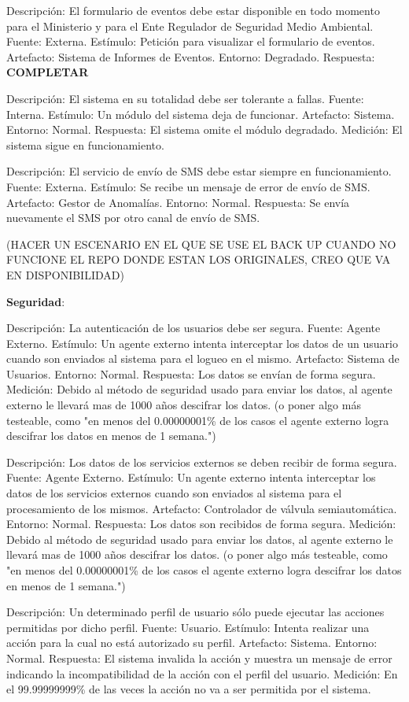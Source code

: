 \documentclass{article}
\theoremstyle{definition}
\theoremstyle{remark}
\begin{document}
Descripción: El formulario de eventos debe estar disponible en todo momento para el Ministerio y para el Ente Regulador de Seguridad Medio Ambiental.
Fuente: Externa.
Estímulo: Petición para visualizar el formulario de eventos.
Artefacto: Sistema de Informes de Eventos.
Entorno: Degradado.
Respuesta: \textbf{COMPLETAR}

Descripción: El sistema en su totalidad debe ser tolerante a fallas.
Fuente: Interna.
Estímulo: Un módulo del sistema deja de funcionar.
Artefacto: Sistema.
Entorno: Normal.
Respuesta: El sistema omite el módulo degradado.
Medición: El sistema sigue en funcionamiento.

Descripción: El servicio de envío de SMS debe estar siempre en funcionamiento.
Fuente: Externa.
Estímulo: Se recibe un mensaje de error de envío de SMS.
Artefacto: Gestor de Anomalías.
Entorno: Normal.
Respuesta: Se envía nuevamente el SMS por otro canal de envío de SMS.

(HACER UN ESCENARIO EN EL QUE SE USE EL BACK UP CUANDO NO FUNCIONE EL REPO DONDE ESTAN LOS ORIGINALES, CREO QUE VA EN DISPONIBILIDAD)

\textbf{Seguridad}:

Descripción: La autenticación de los usuarios debe ser segura.
Fuente: Agente Externo.
Estímulo: Un agente externo intenta interceptar los datos de un usuario cuando son enviados al sistema para el logueo en el mismo.
Artefacto: Sistema de Usuarios.
Entorno: Normal.
Respuesta: Los datos se envían de forma segura.
Medición: Debido al método de seguridad usado para enviar los datos, al agente externo le llevará mas de 1000 años descifrar los datos. (o poner algo más testeable, como "en menos del 0.00000001\% de los casos el agente externo logra descifrar los datos en menos de 1 semana.")

Descripción: Los datos de los servicios externos se deben recibir de forma segura.
Fuente: Agente Externo.
Estímulo: Un agente externo intenta interceptar los datos de los servicios externos cuando son enviados al sistema para el procesamiento de los mismos.
Artefacto: Controlador de válvula semiautomática.
Entorno: Normal.
Respuesta: Los datos son recibidos de forma segura.
Medición: Debido al método de seguridad usado para enviar los datos, al agente externo le llevará mas de 1000 años descifrar los datos. (o poner algo más testeable, como "en menos del 0.00000001\% de los casos el agente externo logra descifrar los datos en menos de 1 semana.")

Descripción: Un determinado perfil de usuario sólo puede ejecutar las acciones permitidas por dicho perfil.
Fuente: Usuario. %
Estímulo: Intenta realizar una acción para la cual no está autorizado su perfil.
Artefacto: Sistema.
Entorno: Normal.
Respuesta: El sistema invalida la acción y muestra un mensaje de error indicando la incompatibilidad de la acción con el perfil del usuario.
Medición: En el 99.99999999\% de las veces la acción no va a ser permitida por el sistema.
\end{document}
